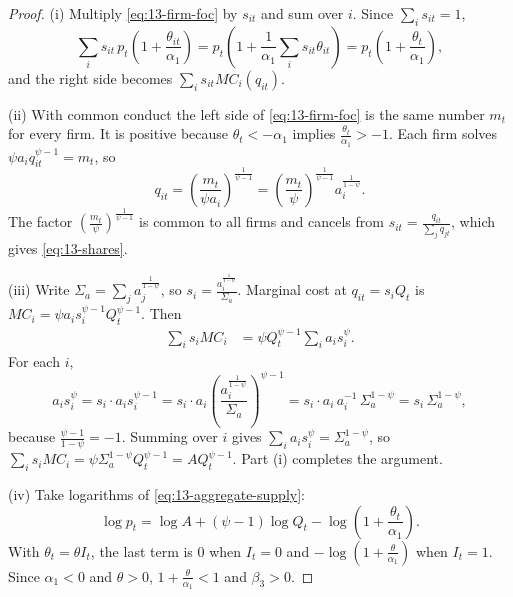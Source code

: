 \begin{proof}
(i) Multiply \eqref{eq:13-firm-foc} by $s_{it}$ and sum over $i$. Since $\sum_i s_{it} = 1$,
\begin{equation*}
  \sum_i s_{it}\, p_t\left(1 + \frac{\theta_{it}}{\alpha_1}\right)
  = p_t\left(1 + \frac{1}{\alpha_1}\sum_i s_{it}\theta_{it}\right)
  = p_t\left(1 + \frac{\theta_t}{\alpha_1}\right),
\end{equation*}
and the right side becomes $\sum_i s_{it} MC_i(q_{it})$.

(ii) With common conduct the left side of \eqref{eq:13-firm-foc} is the same number $m_t$ for every firm. It is
positive because $\theta_t < -\alpha_1$ implies $\frac{\theta_t}{\alpha_1} > -1$. Each firm solves
$\psi a_i q_{it}^{\psi - 1} = m_t$, so
\begin{equation*}
  q_{it} = \left(\frac{m_t}{\psi a_i}\right)^{\frac{1}{\psi - 1}} = \left(\frac{m_t}{\psi}\right)^{\frac{1}{\psi-1}}
  a_i^{\frac{1}{1-\psi}} .
\end{equation*}
The factor $(\frac{m_t}{\psi})^{\frac{1}{\psi - 1}}$ is common to all firms and cancels from
$s_{it} = \frac{q_{it}}{\sum_j q_{jt}}$, which gives \eqref{eq:13-shares}.

(iii) Write $\Sigma_a = \sum_j a_j^{\frac{1}{1-\psi}}$, so $s_i = \frac{a_i^{\frac{1}{1-\psi}}}{\Sigma_a}$. Marginal
cost at $q_{it} = s_i Q_t$ is $MC_i = \psi a_i s_i^{\psi - 1} Q_t^{\psi - 1}$. Then
\begin{align*}
  \sum_i s_i MC_i &= \psi Q_t^{\psi - 1} \sum_i a_i s_i^{\psi} .
\end{align*}
For each $i$,
\begin{equation*}
  a_i s_i^{\psi} = s_i \cdot a_i s_i^{\psi - 1}
  = s_i \cdot a_i \left(\frac{a_i^{\frac{1}{1-\psi}}}{\Sigma_a}\right)^{\psi - 1}
  = s_i \cdot a_i \, a_i^{-1}\, \Sigma_a^{1-\psi} = s_i\, \Sigma_a^{1-\psi},
\end{equation*}
because $\frac{\psi - 1}{1 - \psi} = -1$. Summing over $i$ gives $\sum_i a_i s_i^{\psi} = \Sigma_a^{1-\psi}$, so
$\sum_i s_i MC_i = \psi \Sigma_a^{1-\psi} Q_t^{\psi-1} = A Q_t^{\psi - 1}$. Part (i) completes the argument.

(iv) Take logarithms of \eqref{eq:13-aggregate-supply}:
\begin{equation*}
  \log p_t = \log A + (\psi - 1)\log Q_t - \log\left(1 + \frac{\theta_t}{\alpha_1}\right).
\end{equation*}
With $\theta_t = \theta I_t$, the last term is $0$ when $I_t = 0$ and $-\log(1 + \frac{\theta}{\alpha_1})$ when
$I_t = 1$. Since $\alpha_1 < 0$ and $\theta > 0$, $1 + \frac{\theta}{\alpha_1} < 1$ and $\beta_3 > 0$.
\end{proof}

